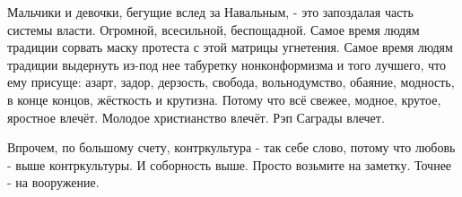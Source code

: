 Мальчики и девочки, бегущие вслед за Навальным, - это запоздалая часть системы
власти. Огромной, всесильной, беспощадной. Самое время людям традиции сорвать
маску протеста с этой матрицы угнетения. Самое время людям традиции выдернуть
из-под нее табуретку нонконформизма и того лучшего, что ему присуще: азарт,
задор, дерзость, свобода, вольнодумство, обаяние, модность, в конце концов,
жёсткость и крутизна. Потому что всё свежее, модное, крутое, яростное влечёт.
Молодое христианство влечёт. Рэп Саграды влечет. 

Впрочем, по большому счету, контркультура - так себе слово, потому что любовь -
выше контркультуры. И соборность выше. Просто возьмите на заметку. Точнее - на
вооружение.

